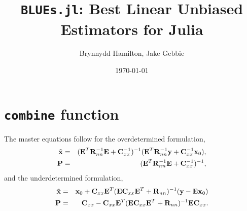 \documentclass{article}
\title{\texttt{BLUEs.jl}: Best Linear Unbiased Estimators for Julia}
\author{Brynnydd Hamilton, Jake Gebbie}
\date{\today}
\begin{document}
\maketitle

\section{\texttt{combine} function}

The master equations follow for the overdetermined formulation,
\begin{eqnarray}
  \label{eq:master5}
{\tilde {\bf x}} &=& ({\bf E}^T {\bf R}_{nn}^{-1} {\bf E} + {\bf C}^{-1}_{xx})^{-1} ({\bf E}^T {\bf R}_{nn}^{-1} {\bf y} + {\bf C}_{xx}^{-1} {\bf x}_0), \\
\label{eq:master6}
{\bf P} &=& ({\bf E}^T {\bf R}_{nn}^{-1} {\bf E} + {\bf C}_{xx}^{-1})^{-1},
\end{eqnarray}
and the underdetermined formulation,
\begin{eqnarray}
  \label{eq:master7}
{\tilde {\bf x}} &=& {\bf x}_0 + {\bf C}_{xx} {\bf E}^T ({\bf EC}_{xx} {\bf E}^T + {\bf R}_{nn})^{-1} ({\bf y}-{\bf Ex}_0) \\
\label{eq:master8}
\bf{P} &=& {\bf C}_{xx} - {\bf C}_{xx} {\bf E}^T ({\bf EC}_{xx} {\bf E}^T + {\bf R}_{nn})^{-1} {\bf EC}_{xx}.
\end{eqnarray}
\end{document}
